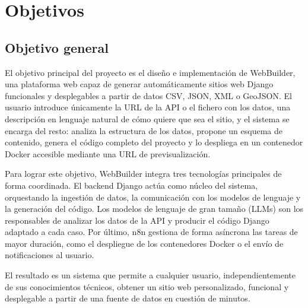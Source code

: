 
\cleardoublepage %
\chapter{Objetivos} %
\label{chap:objetivos} %

\section{Objetivo general} %
\label{sec:objetivo-general} %

El objetivo principal del proyecto es el diseño e implementación de WebBuilder, una plataforma web capaz de generar automáticamente sitios web Django funcionales y desplegables a partir de datos CSV, JSON, XML o GeoJSON. El usuario introduce únicamente la URL de la API o el fichero con los datos, una descripción en lenguaje natural de cómo quiere que sea el sitio, y el sistema se encarga del resto: analiza la estructura de los datos, propone un esquema de contenido, genera el código completo del proyecto y lo despliega en un contenedor Docker accesible mediante una URL de previsualización.

Para lograr este objetivo, WebBuilder integra tres tecnologías principales de forma coordinada. El backend Django actúa como núcleo del sistema, orquestando la ingestión de datos, la comunicación con los modelos de lenguaje y la generación del código. Los modelos de lenguaje de gran tamaño (LLMs) son los responsables de analizar los datos de la API y producir el código Django adaptado a cada caso. Por último, n8n gestiona de forma asíncrona las tareas de mayor duración, como el despliegue de los contenedores Docker o el envío de notificaciones al usuario.

El resultado es un sistema que permite a cualquier usuario, independientemente de sus conocimientos técnicos, obtener un sitio web personalizado, funcional y desplegable a partir de una fuente de datos en cuestión de minutos.

